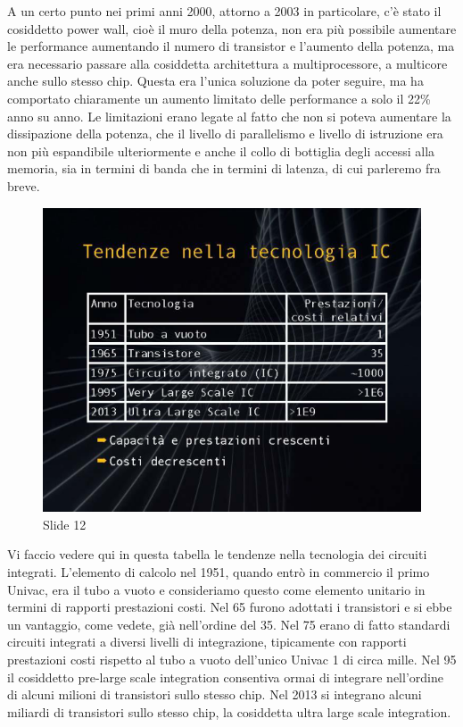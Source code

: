 A un certo punto nei primi anni 2000, attorno a 2003 in particolare, c'è stato il cosiddetto power wall, cioè il muro della potenza, non era più possibile aumentare le performance aumentando il numero di transistor e l'aumento della potenza, ma era necessario passare alla cosiddetta architettura a multiprocessore, a multicore anche sullo stesso chip.
Questa era l'unica soluzione da poter seguire, ma ha comportato chiaramente un aumento limitato delle performance a solo il 22\% anno su anno.
Le limitazioni erano legate al fatto che non si poteva aumentare la dissipazione della potenza, che il livello di parallelismo e livello di istruzione era non più espandibile ulteriormente e anche il collo di bottiglia degli accessi alla memoria, sia in termini di banda che in termini di latenza, di cui parleremo fra breve.


\begin{figure}[ht]
    \centering
    \includegraphics[width=0.6\linewidth]{images/Lez01_p02_fig_06.png}
    \caption{Slide 12}
    \label{fig:slide_12}
\end{figure}

Vi faccio vedere qui in questa tabella le tendenze nella tecnologia dei circuiti integrati.
L'elemento di calcolo nel 1951, quando entrò in commercio il primo Univac, era il tubo a vuoto e consideriamo questo come elemento unitario in termini di rapporti prestazioni costi.
Nel 65 furono adottati i transistori e si ebbe un vantaggio, come vedete, già nell'ordine del 35.
Nel 75 erano di fatto standardi circuiti integrati a diversi livelli di integrazione, tipicamente con rapporti prestazioni costi rispetto al tubo a vuoto dell'unico Univac 1 di circa mille.
Nel 95 il cosiddetto pre-large scale integration consentiva ormai di integrare nell'ordine di alcuni milioni di transistori sullo stesso chip.
Nel 2013 si integrano alcuni miliardi di transistori sullo stesso chip, la cosiddetta ultra large scale integration.

